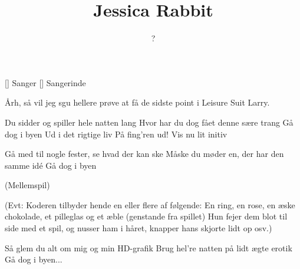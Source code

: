 \documentclass[a4paper,11pt]{article}
\title{Jessica Rabbit}
\author{?}
\begin{document}
\maketitle

\begin{roles}
[] Sanger
[] Sangerinde
\end{roles}

\begin{sketch}

 Årh, så vil jeg sgu hellere prøve at få de sidste point i Leisure Suit Larry.

\end{sketch}

\begin{song}
Du sidder og spiller hele natten lang
Hvor har du dog fået denne sære trang
Gå dog i byen
Ud i det rigtige liv
På fing'ren ud!
Vis nu lit initiv

Gå med til nogle fester, se hvad der kan ske
Måske du møder en, der har den samme idé
Gå dog i byen

(Mellemspil)

(Evt: Koderen tilbyder hende en eller flere af følgende: En ring, en
rose, en æske chokolade, et pilleglas og et æble (genstande fra
spillet) Hun fejer dem blot til side med et spil, og nusser ham i
håret, knapper hans skjorte lidt op osv.)

Så glem du alt om mig og min HD-grafik
Brug hel're natten på lidt ægte erotik
Gå dog i byen...

\end{song}
\end{document}
